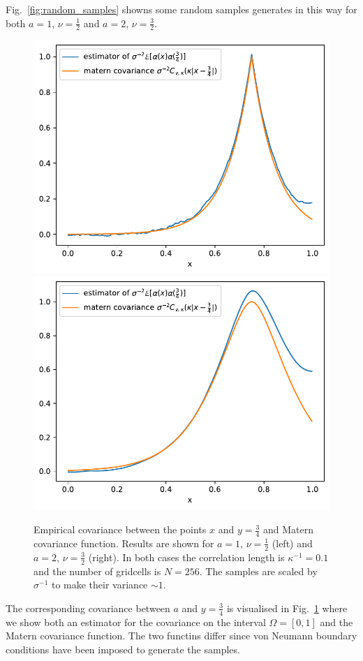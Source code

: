 \documentclass[11pt]{article}
\begin{document}
Fig.~\ref{fig:random_samples} showns some random samples generates in this way for both $a=1$, $\nu=\frac{1}{2}$ and $a=2$, $\nu=\frac{3}{2}$.
\begin{figure}
    \begin{center}
        \includegraphics[width=0.45\linewidth]{figures/covariance_nu0_5.pdf}
        \hfill
        \includegraphics[width=0.45\linewidth]{figures/covariance_nu1_5.pdf}
    \end{center}
    \caption{Empirical covariance between the points $x$ and $y=\frac{3}{4}$ and Matern covariance function. Results are shown for $a=1$, $\nu=\frac{1}{2}$ (left) and $a=2$, $\nu=\frac{3}{2}$ (right). In both cases the correlation length is $\kappa^{-1}=0.1$ and the number of gridcells is $N=256$. The samples are scaled by $\sigma^{-1}$ to make their variance $\sim 1$.}
    \label{fig:lognormal_covariance}
\end{figure}
The corresponding covariance between $a$ and $y=\frac{3}{4}$ is visualised in Fig.~\ref{fig:lognormal_covariance} where we show both an estimator for the covariance on the interval $\Omega=[0,1]$ and the Matern covariance function. The two functins differ since von Neumann boundary conditions have been imposed to generate the samples.


\end{document}
